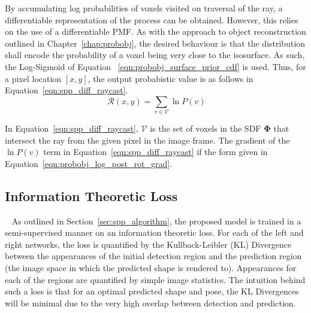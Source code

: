 By accumulating log probabilities of voxels visited on traversal of the ray, a differentiable representation 
of the process can be obtained. However, this relies on the use of a differentiable PMF\@. As with the approach 
to object reconstruction outlined in Chapter~\ref{chap:probobj}, the desired behaviour is that the distribution 
shall encode the probability of a voxel being very close to the isosurface. As such, the Log-Sigmoid of Equation
~\ref{eqn:probobj_surface_prior_cdf} is used. Thus, for a pixel location \( [x, y] \), the output probabistic 
value is as follows in Equation~\ref{eqn:spp_diff_raycast}.
\begin{equation}
~\label{eqn:spp_diff_raycast}
\mathcal{R}(x, y) = \sum_{v \in \mathcal{V}} \ln P(v)
\end{equation}

In Equation~\ref{eqn:spp_diff_raycast}, \( \mathcal{V} \) is the set of voxels in the SDF \( \bm{\Phi} \) that 
intersect the ray from the given pixel in the image frame. The gradient of the \( \ln P(v) \) term in 
Equation~\ref{eqn:spp_diff_raycast} if the form given in Equation~\ref{eqn:probobj_log_post_rot_grad}.

\subsection{Information Theoretic Loss}
~\label{subsec:spp_loss}
As outlined in Section~\ref{sec:spp_algorithm}, the proposed model is trained in a semi-supervised 
manner on an information theoretic loss. For each of the left and right networks, the loss is 
quantified by the Kullback-Leibler (KL) Divergence between the appearances of the initial detection region 
and the prediction region (the image space in which the predicted shape is rendered to). Appearances for 
each of the regions are quantified by simple image statistics. The intuition behind such a loss is that 
for an optimal predicted shape and pose, the KL Divergences will be minimal due to the very high overlap 
between detection and prediction.

